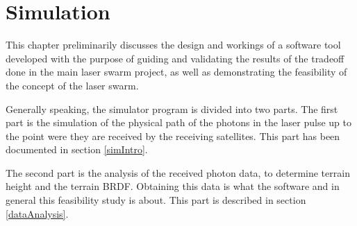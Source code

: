\chapter{Simulation}
\label{sim}
This chapter preliminarily discusses the design and workings of a software tool developed with the purpose of guiding and validating the results of the tradeoff done in the main laser swarm project, as well as demonstrating the feasibility of the concept of the laser swarm.

Generally speaking, the simulator program is divided into two parts. The first part is the simulation of the physical path of the photons in the laser pulse up to the point were they are received by the receiving satellites. This part has been documented in section \ref{simIntro}.

The second part is the analysis of the received photon data, to determine terrain height and the terrain \ac{BRDF}. Obtaining this data is what the software and in general this feasibility study is about. This part is described in section \ref{dataAnalysis}.

